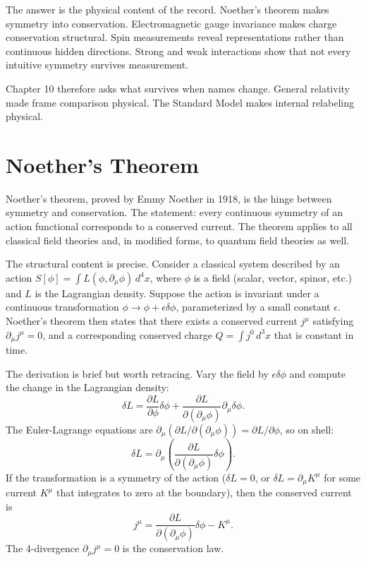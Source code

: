 \begin{chapteressay}
The answer is the physical content of the record. Noether's theorem makes
symmetry into conservation. Electromagnetic gauge invariance makes charge
conservation structural. Spin measurements reveal representations rather than
continuous hidden directions. Strong and weak interactions show that not every
intuitive symmetry survives measurement.


Chapter 10 therefore asks what survives when names change. General relativity
made frame comparison physical. The Standard Model makes internal relabeling
physical.

\end{chapteressay}


\section{Noether's Theorem}
\label{se:noethers-theorem}

Noether's theorem, proved by Emmy Noether in 1918, is the hinge between
symmetry and conservation. The statement: every continuous symmetry of an
action functional corresponds to a conserved current. The theorem applies
to all classical field theories and, in modified forms, to quantum field
theories as well.

The structural content is precise. Consider a classical system described by
an action $S[\phi] = \int L(\phi, \partial_\mu \phi) \, d^4x$, where $\phi$
is a field (scalar, vector, spinor, etc.) and $L$ is the Lagrangian density.
Suppose the action is invariant under a continuous transformation
$\phi \to \phi + \epsilon \delta\phi$, parameterized by a small constant
$\epsilon$. Noether's theorem then states that there exists a conserved
current $j^\mu$ satisfying $\partial_\mu j^\mu = 0$, and a corresponding
conserved charge $Q = \int j^0 \, d^3x$ that is constant in time.

The derivation is brief but worth retracing. Vary the field by $\epsilon
\delta\phi$ and compute the change in the Lagrangian density:
\[
\delta L = \frac{\partial L}{\partial \phi} \delta\phi + \frac{\partial L}{\partial(\partial_\mu \phi)} \partial_\mu \delta\phi.
\]
The Euler-Lagrange equations are $\partial_\mu(\partial L/\partial(\partial_\mu \phi)) = \partial L/\partial \phi$, so on shell:
\[
\delta L = \partial_\mu\left(\frac{\partial L}{\partial(\partial_\mu \phi)} \delta\phi\right).
\]
If the transformation is a symmetry of the action ($\delta L = 0$, or
$\delta L = \partial_\mu K^\mu$ for some current $K^\mu$ that integrates
to zero at the boundary), then the conserved current is
\[
j^\mu = \frac{\partial L}{\partial(\partial_\mu \phi)} \delta\phi - K^\mu.
\]
The 4-divergence $\partial_\mu j^\mu = 0$ is the conservation law.

